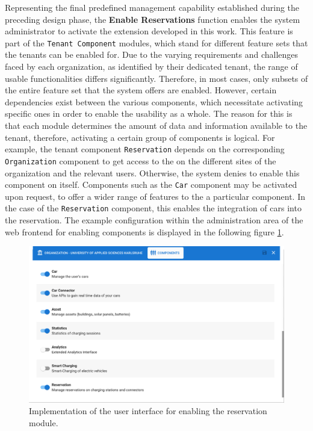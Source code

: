 Representing the final predefined management capability established during the preceding design phase, the \textbf{Enable Reservations} function enables the system administrator to activate the extension developed in this work.
This feature is part of the \texttt{Tenant Component} modules, which stand for different feature sets that the tenants can be enabled for.  
Due to the varying requirements and challenges faced by each organization, as identified by their dedicated tenant, the range of  usable functionalities differs significantly. Therefore, in most cases, only subsets of the entire feature set that the system offers are enabled.
However, certain dependencies exist between the various components, which necessitate activating specific ones in order to enable the usability as a whole. The reason for this is that each module determines the amount of data and information available to the tenant, therefore, activating a certain group of components is logical.
For example, the tenant component \texttt{Reservation} depends on the corresponding \texttt{Organization} component to get access to the  on the different sites of the organization and the relevant users. Otherwise, the system denies to enable this component on itself.
Components such as the \texttt{Car} component may be activated upon request, to offer a wider range of features to the a particular component. In the case of the \texttt{Reservation} component, this enables the integration of cars into the reservation.
The example configuration within the administration area of the web frontend for enabling components is displayed in the following figure \ref{fig:enable-reservation-impl}.

\begin{figure}[h]
    \centering
    \includegraphics[scale=0.3]{resources/images/main/6_implementation/screens/enable_reservations/Reservation_Module.png}
    \caption{Implementation of the user interface for enabling the reservation module.}
    \label{fig:enable-reservation-impl}
\end{figure}

